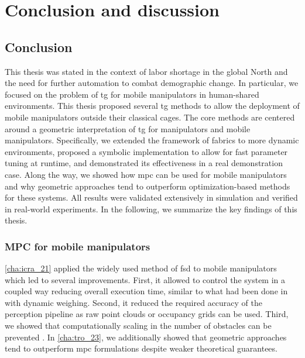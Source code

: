\chapter{Conclusion and discussion}
\label{cha:conclusion}



\newpage

\section{Conclusion}
\label{sec:conclusion}

This thesis was stated in the context of labor shortage in the global North and
the need for further automation to combat demographic change. In particular, we
focused on the problem of \ac{tg} for mobile manipulators in human-shared
environments. This thesis proposed several \ac{tg} methods to allow the
deployment of mobile manipulators outside their classical cages.
The core methods are centered around a
geometric interpretation of \ac{tg} for
manipulators and mobile manipulators. Specifically, we extended the framework of
\ac{fabrics} to more dynamic environments, proposed a symbolic implementation to
allow for fast parameter tuning at runtime, and demonstrated its effectiveness
in a real demonstration case. Along the way, we showed how \ac{mpc} can be used
for mobile manipulators and why geometric approaches tend to outperform
optimization-based methods for these systems. All results were validated
extensively in simulation and verified in real-world experiments. In the
following, we summarize the key findings of this thesis.

\subsection{MPC for mobile manipulators}
\label{sec:conclusion_mpc}

\cref{cha:icra_21} applied the widely used method of \ac{fsd} to mobile
manipulators which led to several improvements. First, it allowed to control
the system in a coupled way reducing overall execution time, similar to what had
been done in \cite{Avanzini2018} with dynamic weighing. Second, it reduced the
required accuracy of the perception pipeline as raw point clouds or occupancy
grids can be used. Third, we showed that computationally scaling in the number
of obstacles can be prevented . In \cref{cha:tro_23},
we additionally showed that geometric approaches tend to outperform \ac{mpc}
formulations despite weaker theoretical guarantees.

